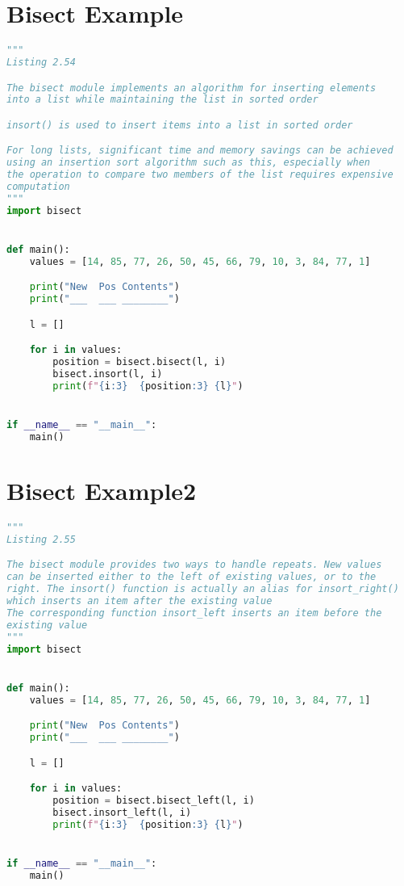 \documentclass[a4paper,landscape]{report}
\begin{document}
\section{Bisect Example}
\begin{lstlisting}[language=Python]
"""
Listing 2.54

The bisect module implements an algorithm for inserting elements
into a list while maintaining the list in sorted order

insort() is used to insert items into a list in sorted order

For long lists, significant time and memory savings can be achieved
using an insertion sort algorithm such as this, especially when
the operation to compare two members of the list requires expensive
computation
"""
import bisect


def main():
    values = [14, 85, 77, 26, 50, 45, 66, 79, 10, 3, 84, 77, 1]

    print("New  Pos Contents")
    print("___  ___ ________")

    l = []

    for i in values:
        position = bisect.bisect(l, i)
        bisect.insort(l, i)
        print(f"{i:3}  {position:3} {l}")


if __name__ == "__main__":
    main()

\end{lstlisting}
\section{Bisect Example2}
\begin{lstlisting}[language=Python]
"""
Listing 2.55

The bisect module provides two ways to handle repeats. New values
can be inserted either to the left of existing values, or to the
right. The insort() function is actually an alias for insort_right()
which inserts an item after the existing value
The corresponding function insort_left inserts an item before the
existing value
"""
import bisect


def main():
    values = [14, 85, 77, 26, 50, 45, 66, 79, 10, 3, 84, 77, 1]

    print("New  Pos Contents")
    print("___  ___ ________")

    l = []

    for i in values:
        position = bisect.bisect_left(l, i)
        bisect.insort_left(l, i)
        print(f"{i:3}  {position:3} {l}")


if __name__ == "__main__":
    main()

\end{lstlisting}
\end{document}
